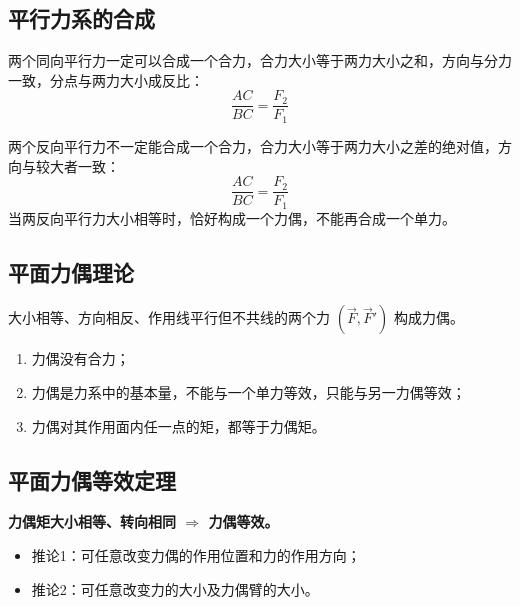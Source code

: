 \subsection{平行力系的合成}

 两个同向平行力一定可以合成一个合力，合力大小等于两力大小之和，方向与分力一致，分点与两力大小成反比：
\begin{equation}
\frac{AC}{BC}=\frac{F_2}{F_1}
\label{eq:2-平行力-同向}
\end{equation}

 两个反向平行力不一定能合成一个合力，合力大小等于两力大小之差的绝对值，方向与较大者一致：
\begin{equation}
\frac{AC}{BC}=\frac{F_2}{F_1}
\label{eq:2-平行力-反向}
\end{equation}
当两反向平行力大小相等时，恰好构成一个力偶，不能再合成一个单力。

\subsection{平面力偶理论}

 大小相等、方向相反、作用线平行但不共线的两个力 $(\vec{F},\vec{F}')$ 构成力偶。

\begin{enumerate}
\item 力偶没有合力；
\item 力偶是力系中的基本量，不能与一个单力等效，只能与另一力偶等效；
\item 力偶对其作用面内任一点的矩，都等于力偶矩。
\end{enumerate}

\subsection{平面力偶等效定理}

\textbf{力偶矩大小相等、转向相同 $\Rightarrow$ 力偶等效。}
\begin{itemize}
\item 推论1：可任意改变力偶的作用位置和力的作用方向；
\item 推论2：可任意改变力的大小及力偶臂的大小。
\end{itemize}

